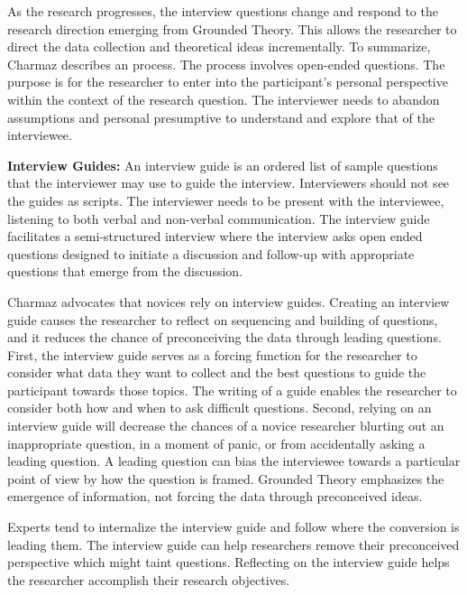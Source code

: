 As the research progresses, the interview questions change and respond to the research direction emerging from Grounded Theory. This allows the researcher to direct the data collection and theoretical ideas incrementally.
To summarize, Charmaz describes an  process. The process involves open-ended questions. The purpose is for the researcher to enter into the participant's personal perspective within the context of the research question. The interviewer needs to abandon assumptions and personal presumptive to understand and explore that of the interviewee. %

\textbf{Interview Guides:} An interview guide is an ordered list of sample questions that the interviewer may use to guide the interview. Interviewers should not see the guides as scripts. The interviewer needs to be present with the interviewee, listening to both verbal and non-verbal communication. The interview guide facilitates a semi-structured interview where the interview asks open ended questions designed to initiate a discussion and follow-up with appropriate questions that emerge from the discussion.

Charmaz advocates that novices rely on interview guides. Creating an interview guide causes the researcher to reflect on sequencing and building of questions, and it reduces the chance of preconceiving the data through leading questions. First, the interview guide serves as a forcing function for the researcher to consider what data they want to collect and the best questions to guide the participant towards those topics. The writing of a guide enables the researcher to consider both how and when to ask difficult questions. Second, relying on an interview guide will decrease the chances of a novice researcher blurting out an inappropriate question, in a moment of panic, or from accidentally asking a leading question. A leading question can bias the interviewee towards a particular point of view by how the question is framed. Grounded Theory emphasizes the emergence of information, not forcing the data through preconceived ideas. 

Experts tend to internalize the interview guide and follow where the conversion is leading them. The interview guide can help researchers remove their preconceived perspective which might taint questions. Reflecting on the interview guide helps the researcher accomplish their research objectives. 

